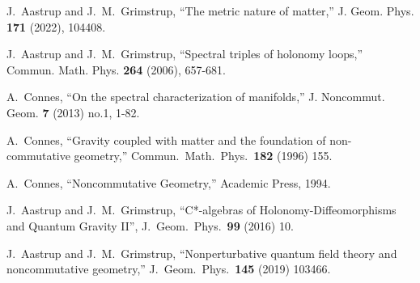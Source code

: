 \documentclass[letterpaper,11pt]{article}
\begin{document}
\begin{thebibliography}{99}




J.~Aastrup and J.~M.~Grimstrup,
``The metric nature of matter,''
J. Geom. Phys. \textbf{171} (2022), 104408.


J.~Aastrup and J.~M.~Grimstrup,
``Spectral triples of holonomy loops,''
Commun. Math. Phys. \textbf{264} (2006), 657-681.




A.~Connes,
``On the spectral characterization of manifolds,''
J. Noncommut. Geom. \textbf{7} (2013) no.1, 1-82.




A.~Connes,
``Gravity coupled with matter and the foundation of non-commutative
geometry,''
Commun.\ Math.\ Phys.\  {\bf 182} (1996) 155.





A.~Connes,
``Noncommutative Geometry,'' Academic Press, 1994.







  J.~Aastrup and J.~M.~Grimstrup,
  ``C*-algebras of Holonomy-Diffeomorphisms and Quantum Gravity II'',
   J.\ Geom.\ Phys.\  {\bf 99} (2016) 10.






  J.~Aastrup and J.~M.~Grimstrup,
  ``Nonperturbative quantum field theory and noncommutative geometry,''
  J.\ Geom.\ Phys.\  {\bf 145} (2019) 103466.




\end{thebibliography}
\end{document}
